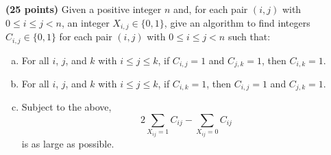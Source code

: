 \documentclass[11pt,letterpaper]{article}
\begin{document}
\pagebreak
\begin{problem}
    {\bf (25 points)} Given a positive integer $n$ and, for each pair $(i,j)$ with $0 \le i \le j < n$, an integer $X_{i,j} \in \{0,1\}$, give an algorithm to find integers $C_{i,j} \in \{0,1\}$ for each pair $(i,j)$ with $0 \le i \le j < n$ such that: 
    \begin{enumerate}[(a)]
        \item For all $i$, $j$, and $k$ with $i \le j \le k$, if $C_{i,j} = 1$ and $C_{j,k} = 1$, then $C_{i,k} = 1$.
        \item For all $i$, $j$, and $k$ with $i \le j \le k$, if $C_{i,k} = 1$, then $C_{i,j} = 1$ and $C_{j,k} = 1$.
        \item Subject to the above, $$2\sum_{X_{ij} = 1} C_{ij} - \sum_{X_{ij} = 0} C_{ij}$$ is as large as possible.
    \end{enumerate}
\end{problem}
\end{document}
